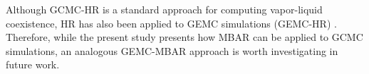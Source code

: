 \documentclass[journal=jced,manuscript=article]{achemso}
\begin{document}
%
%

Although GCMC-HR is a standard approach for computing vapor-liquid coexistence, HR has also been applied to GEMC simulations (GEMC-HR) \cite{Boulougouris2010}. Therefore, while the present study presents how MBAR can be applied to GCMC simulations, an analogous GEMC-MBAR approach is worth investigating in future work. 

%

\end{document}
